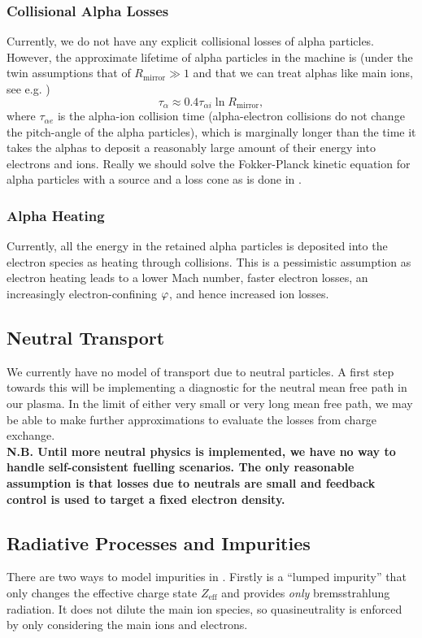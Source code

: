 \documentclass{revtex4}
\begin{document}
\subsubsection{Collisional Alpha Losses}
Currently, we do not have any explicit collisional losses of alpha particles. However, the approximate lifetime of alpha particles in the machine is (under the twin assumptions that of $R_{\mathrm{mirror}} \gg 1$ and that we can treat alphas like main ions, see e.g. \citet{ryutovOpenTraps})
\begin{equation}
\tau_\alpha \approx 0.4 \tau_{\alpha i} \ln R_{\mathrm{mirror}},
\end{equation}
where $\tau_{\alpha e}$ is the alpha-ion collision time (alpha-electron collisions do not change the pitch-angle of the alpha particles), which is marginally longer than the time it takes the alphas to deposit a reasonably large amount of their energy into electrons and ions.
Really we should solve the Fokker-Planck kinetic equation for alpha particles with a source and a loss cone as is done in \citet{santarius1982}.

\subsubsection{Alpha Heating}
Currently, all the energy in the retained alpha particles is deposited into the electron species as heating through collisions.
This is a pessimistic assumption as electron heating leads to a lower Mach number, faster electron losses, an increasingly electron-confining $\varphi$, and hence increased ion losses. 

\subsection{Neutral Transport}
We currently have no model of transport due to neutral particles. A first step towards this will be implementing a diagnostic for 
the neutral mean free path in our plasma. In the limit of either very small or very long mean free path, we may be able to make further approximations to evaluate the 
losses from charge exchange.
\\
\textbf{N.B. Until more neutral physics is implemented, we have no way to handle self-consistent fuelling scenarios. The only reasonable assumption
	is that losses due to neutrals are small and feedback control is used to target a fixed electron density.}

\subsection{Radiative Processes and Impurities}
There are two ways to model impurities in \mctrans{}. Firstly is a ``lumped impurity'' that only changes the effective charge state $Z_{\mathrm{eff}}$ and 
provides \textit{only} bremsstrahlung radiation. It does not dilute the main ion species, so quasineutrality is enforced by only considering the main ions and 
electrons.
\end{document}
